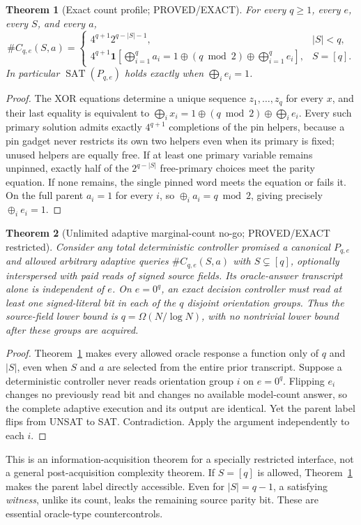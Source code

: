 \documentclass[11pt]{article}
\newtheorem{theorem}{Theorem}
\newcommand{\SAT}{\operatorname{SAT}}
\begin{document}
\begin{theorem}[Exact count profile; PROVED/EXACT]\label{thm:counts}
For every $q\ge1$, every $e$, every $S$, and every $a$,
\[
\# C_{q,e}(S,a)=
\begin{cases}
4^{q+1}2^{q-|S|-1},& |S|<q,\\[2pt]
4^{q+1}\mathbf1\left[
 \bigoplus_{i=1}^q a_i =
 1\oplus(q\bmod2)\oplus\bigoplus_{i=1}^q e_i
 \right],& S=[q].
\end{cases}
\]
In particular $\SAT(P_{q,e})$ holds exactly when $\bigoplus_i e_i=1$.
\end{theorem}
\begin{proof}
The XOR equations determine a unique sequence $z_1,\ldots,z_q$ for every $x$, and their last equality is equivalent to
$\bigoplus_i x_i=1\oplus(q\bmod2)\oplus\bigoplus_i e_i$.
Every such primary solution admits exactly $4^{q+1}$ completions of the pin helpers, because a pin gadget never restricts its own two helpers even when its primary is fixed; unused helpers are equally free. If at least one primary variable remains unpinned, exactly half of the $2^{q-|S|}$ free-primary choices meet the parity equation. If none remains, the single pinned word meets the equation or fails it. On the full parent $a_i=1$ for every $i$, so $\oplus_i a_i=q\bmod2$, giving precisely $\oplus_i e_i=1$.
\end{proof}

\begin{theorem}[Unlimited adaptive marginal-count no-go; PROVED/EXACT restricted]\label{thm:oracle}
Consider any total deterministic controller promised a canonical $P_{q,e}$ and allowed arbitrary adaptive queries $\#C_{q,e}(S,a)$ with $S\subsetneq[q]$, optionally interspersed with paid reads of signed source fields. Its oracle-answer transcript alone is independent of $e$. On $e=0^q$, an exact decision controller must read at least one signed-literal bit in each of the $q$ disjoint orientation groups. Thus the source-field lower bound is $q=\Omega(N/\log N)$, with no nontrivial lower bound after these groups are acquired.
\end{theorem}
\begin{proof}
Theorem~\ref{thm:counts} makes every allowed oracle response a function only of $q$ and $|S|$, even when $S$ and $a$ are selected from the entire prior transcript. Suppose a deterministic controller never reads orientation group $i$ on $e=0^q$. Flipping $e_i$ changes no previously read bit and changes no available model-count answer, so the complete adaptive execution and its output are identical. Yet the parent label flips from UNSAT to SAT. Contradiction. Apply the argument independently to each $i$.
\end{proof}
This is an information-acquisition theorem for a specially restricted interface, not a general post-acquisition complexity theorem. If $S=[q]$ is allowed, Theorem~\ref{thm:counts} makes the parent label directly accessible. Even for $|S|=q-1$, a satisfying \emph{witness}, unlike its count, leaks the remaining source parity bit. These are essential oracle-type countercontrols.
\end{document}

